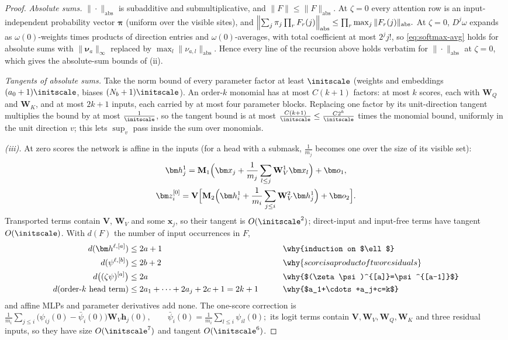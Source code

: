 \begin{proof}
\emph{Absolute sums.} $\|\cdot\|_{\mathrm{abs}}$ is subadditive and submultiplicative, and $\|F\|\le\|F\|_{\mathrm{abs}}$. At $\zeta=0$ every attention row is an
input-independent probability vector $\bm\pi$ (uniform over the visible sites), and
 $\Bigl\|\textstyle\sum_j\pi_j\prod_rF_r(j)\Bigr\|_{\mathrm{abs}}\le\prod_r\max_j\|F_r(j)\|_{\mathrm{abs}} .$ 
At $\zeta=0$, $D^j\omega$ expands as $\omega(0)$-weights times products of direction entries and $\omega(0)$-averages, with total coefficient at most $2^jj!$,
so \cref{eq:softmax-avg} holds for absolute sums with $\|\bm\nu_a\|_\infty$ replaced by $\max_l\|\nu_{a,l}\|_{\mathrm{abs}}$. Hence every line of the recursion
above holds verbatim for $\|\cdot\|_{\mathrm{abs}}$ at $\zeta=0$, which gives the absolute-sum bounds of (ii).

\emph{Tangents of absolute sums.} Take the norm bound of every parameter factor at least $\initscale$ (weights and embeddings $(a_0+1)\initscale$,
biases $(N_b+1)\initscale$). An order-$k$ monomial has at most $C(k+1)$ factors: at most $k$ scores, each with $\mathbf W_Q$ and $\mathbf W_K$, and at
most $2k+1$ inputs, each carried by at most four parameter blocks. Replacing one factor by its unit-direction tangent multiplies the bound by at
most $\frac{1}{\initscale}$, so the tangent bound is at most $\frac{C(k+1)}{\initscale}\le\frac{C2^k}{\initscale}$ times the monomial bound, uniformly in the unit direction
$v$; this lets $\sup_v$ pass inside the sum over monomials.

\emph{(iii).} At zero scores the network is affine in the inputs (for a head with a submask, $\frac{1}{m_j}$ becomes one over the size of its
visible set):
\begin{gather*}
 \bm h^1_j=\mathbf M_1\Bigl(\bm x_j+\frac{1}{m_j}\sum_{l\le j}\mathbf W^1_V\bm x_l\Bigr)+\bm o_1,\\
 \bm z^{[0]}_i=\mathbf V\Bigl[\mathbf M_2\Bigl(\bm h^1_i+\frac{1}{m_i}\sum_{j\le i}\mathbf W^2_V\bm h^1_j\Bigr)+\bm o_2\Bigr].
\end{gather*}
Transported terms contain $\mathbf V$, $\mathbf W_V$ and some $\bm x_j$, so their tangent is $O(\initscale^2)$; direct-input and input-free terms have tangent $O(\initscale)$.
With $d(F)$ the number of input occurrences in $F$,
\begin{alignat*}{2}
 d(\bm h^{\ell,[a]})&\le2a+1 &\qquad& \why{induction on $\ell$}\\
 d(\psi^{\ell,[b]})&\le2b+2 && \why{score is a product of two residuals}\\
 d\bigl((\zeta\psi)^{[a]}\bigr)&\le2a && \why{$(\zeta\psi)^{[a]}=\psi^{[a-1]}$}\\
 d(\text{order-$k$ head term})&\le2a_1+\cdots+2a_j+2c+1=2k+1 && \why{$a_1+\cdots+a_j+c=k$}
\end{alignat*}
and affine MLPs and parameter derivatives add none. The one-score correction is
 $\frac{1}{m_i}\sum_{j\le i}\bigl(\psi_{ij}(0)-\bar\psi_i(0)\bigr)\mathbf W_V\bm h_j(0),\qquad \bar\psi_i(0)=\frac{1}{m_i}\sum_{l\le i}\psi_{il}(0);$ 
its logit terms contain $\mathbf V,\mathbf W_V,\mathbf W_Q,\mathbf W_K$ and three residual inputs, so they have size $O(\initscale^7)$ and tangent $O(\initscale^6)$.


\end{proof}
